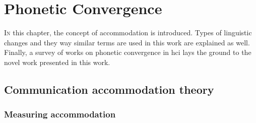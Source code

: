 \chapter{Phonetic Convergence}
\label{chap:phonetic_convergence}

\lettrine{I}{n} this chapter, the concept of accommodation is introduced.
Types of linguistic changes and they way similar terms are used in this work are explained as well.
Finally, a survey of works on phonetic convergence in \acl{hci} lays the ground to the novel work presented in this work.

\pagebreak

\section{Communication accommodation theory}
\label{sec:communication_accommodation_theory}

\citet{Aubanel2020speaking}  %
\citet{Babel2012role} %
\citet{Lehnert2020relationship} %
\citet{Local2007phonetic} %
\citet{Natale1975convergence} %
\citet{Edlund2009pause} %
\citet{Borrie2017conversational} %
\citet{Law2020convergence} %
\citet{Baumann2020how} %

\citet{Racz2020morphological}  %
\citet{Lopes2013lexical} %
\citet{Bergqvist2020nontrivial} %


\subsection{Measuring accommodation}
\label{subsec:measuring_accommodation}

